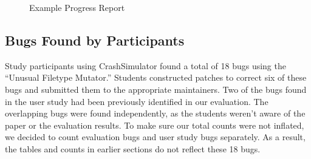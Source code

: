 \begin{figure}[btp]
\centering
{}
\caption[Example Progress Report]{Example Progress Report}
\label{fig:examplereport}
\end{figure}
\restoregeometry

\subsection{Bugs Found by Participants}
\label{subsec:bugs-by-participants}
Study participants using CrashSimulator found a total of 18 bugs
using the ``Unusual Filetype Mutator.''
Students constructed patches to correct six of these bugs and submitted
them to the appropriate maintainers.
Two of the bugs found in the user study
had been previously identified
in our evaluation.
The overlapping bugs were found independently,
as the students weren't aware of the paper or the evaluation results.
To make sure our total counts were not inflated,
we decided to count evaluation bugs and user study bugs separately.
As a result, the tables and counts in earlier
sections do not reflect these 18 bugs.

